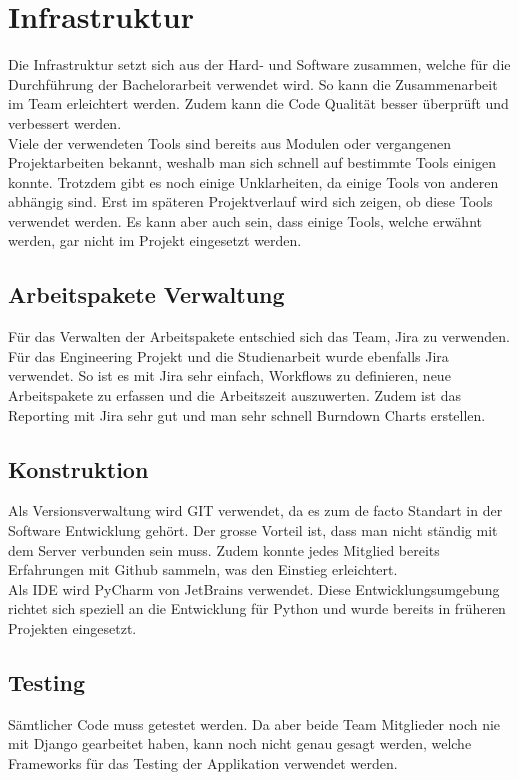 \section{Infrastruktur}
Die Infrastruktur setzt sich aus der Hard- und Software zusammen, welche für die Durchführung der Bachelorarbeit verwendet wird. So kann die Zusammenarbeit im Team erleichtert werden. Zudem kann die Code Qualität besser überprüft und verbessert werden.
\\
Viele der verwendeten Tools sind bereits aus Modulen oder vergangenen Projektarbeiten bekannt, weshalb man sich schnell auf bestimmte Tools einigen konnte. Trotzdem gibt es noch einige Unklarheiten, da einige Tools von anderen abhängig sind. Erst im späteren Projektverlauf wird sich zeigen, ob diese Tools verwendet werden. Es kann aber auch sein, dass einige Tools, welche erwähnt werden, gar nicht im Projekt eingesetzt werden.

\subsection{Arbeitspakete Verwaltung}
Für das Verwalten der Arbeitspakete entschied sich das Team, Jira zu verwenden. Für das Engineering Projekt und die Studienarbeit wurde ebenfalls Jira verwendet. So ist es mit Jira sehr einfach, Workflows zu definieren, neue Arbeitspakete zu erfassen und die Arbeitszeit auszuwerten. Zudem ist das Reporting mit Jira sehr gut und man sehr schnell Burndown Charts erstellen.

\subsection{Konstruktion}
Als Versionsverwaltung wird GIT verwendet, da es zum de facto Standart in der Software Entwicklung gehört. Der grosse Vorteil ist, dass man nicht ständig mit dem Server verbunden sein muss. Zudem konnte jedes Mitglied bereits Erfahrungen mit Github sammeln, was den Einstieg erleichtert.
\\
Als IDE wird PyCharm von JetBrains verwendet. Diese Entwicklungsumgebung richtet sich speziell an die Entwicklung für Python und wurde bereits in früheren Projekten eingesetzt.

\subsection{Testing}
Sämtlicher Code muss getestet werden. Da aber beide Team Mitglieder noch nie mit Django gearbeitet haben, kann noch nicht genau gesagt werden, welche Frameworks für das Testing der Applikation verwendet werden.

